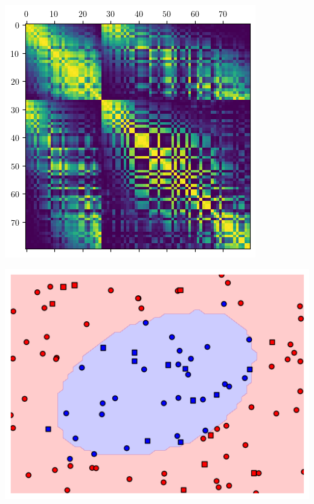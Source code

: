 \documentclass{beamer}
\begin{document}
\begin{frame}
        \pause
        \begin{minipage}{.45\textwidth}
            \centering
            \includegraphics[width=.7\textwidth]{pics/rot-enc-kernel-matrix.png}
        \end{minipage}
        \begin{minipage}{.45\textwidth}
            \centering
            \includegraphics[width=.8\textwidth]{pics/rot-enc-kernel-envelope.png}
        \end{minipage}
        
        
    \end{frame}
\end{document}
